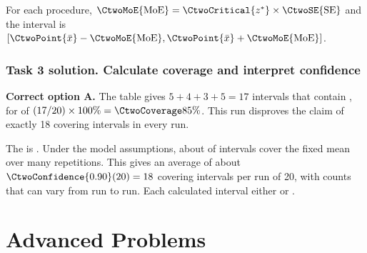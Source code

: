 For each procedure, $\CtwoMoE{\mathrm{MoE}}=\CtwoCritical{z^*}\times\CtwoSE{\mathrm{SE}}$ and the interval is $[\CtwoPoint{\bar{x}}-\CtwoMoE{\mathrm{MoE}},\CtwoPoint{\bar{x}}+\CtwoMoE{\mathrm{MoE}}]$.


\par\vspace{3mm}


\noindent\begin{minipage}{\linewidth}
\subsubsection*{Task 3 solution. Calculate coverage and interpret confidence}
\label{sol:c2-3-c}

\textbf{Correct option A.} The table gives $5+4+3+5=17$ intervals that contain , for  of $(17/20)\times100\%=\CtwoCoverage{85\%}$. This run disproves the claim of exactly 18 covering intervals in every run.

The  is . Under the model assumptions, about  of intervals cover the fixed mean over many repetitions. This gives an average of about $\CtwoConfidence{0.90}(20)=18$ covering intervals per run of 20, with counts that can vary from run to run. Each calculated interval either  or .

\par\vspace{3mm}
\end{minipage}\par

\clearpage

\section{Advanced Problems}
\label{sec:advanced}

